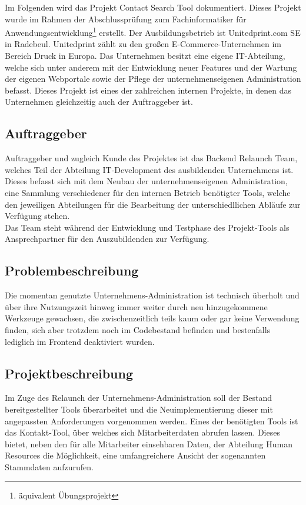 Im Folgenden wird das Projekt \glqq Contact Search Tool\grqq{} dokumentiert. Dieses Projekt wurde im Rahmen der Abschlussprüfung zum Fachinformatiker für Anwendungsentwicklung\footnote{äquivalent Übungsprojekt} erstellt. Der Ausbildungsbetrieb ist Unitedprint.com SE in Radebeul. Unitedprint zählt zu den großen E-Commerce-Unternehmen im Bereich Druck in Europa. Das Unternehmen besitzt eine eigene IT-Abteilung, welche sich unter anderem mit der Entwicklung neuer Features und der Wartung der eigenen Webportale sowie der Pflege der unternehmenseigenen Administration befasst. Dieses Projekt ist eines der zahlreichen internen Projekte, in denen das Unternehmen gleichzeitig auch der Auftraggeber ist.\\

\subsection{Auftraggeber}
    Auftraggeber und zugleich Kunde des Projektes ist das Backend Relaunch Team, welches Teil der Abteilung IT-Development des ausbildenden Unternehmens ist. Dieses befasst sich mit dem Neubau der unternehmenseigenen Administration, eine Sammlung verschiedener für den internen Betrieb benötigter Tools, welche den jeweiligen Abteilungen für die Bearbeitung der unterschiedllichen Abläufe zur Verfügung stehen.\\
    Das Team steht während der Entwicklung und Testphase des Projekt-Tools als Ansprechpartner für den Auszubildenden zur Verfügung.

\subsection{Problembeschreibung}
    Die momentan genutzte Unternehmens-Administration ist technisch überholt und über ihre Nutzungszeit hinweg immer weiter durch neu hinzugekommene Werkzeuge  gewachsen, die zwischenzeitlich teils kaum oder gar keine Verwendung finden, sich aber trotzdem noch im Codebestand befinden und bestenfalls lediglich im Frontend deaktiviert wurden.

\subsection{Projektbeschreibung}
    Im Zuge des Relaunch der Unternehmens-Administration soll der Bestand bereitgestellter Tools überarbeitet und die Neuimplementierung dieser mit angepassten Anforderungen vorgenommen werden. Eines der benötigten Tools ist das Kontakt-Tool, über welches sich Mitarbeiterdaten abrufen lassen. Dieses bietet, neben den für alle Mitarbeiter einsehbaren Daten, der Abteilung Human Resources die Möglichkeit, eine umfangreichere Ansicht der sogenannten Stammdaten aufzurufen.

